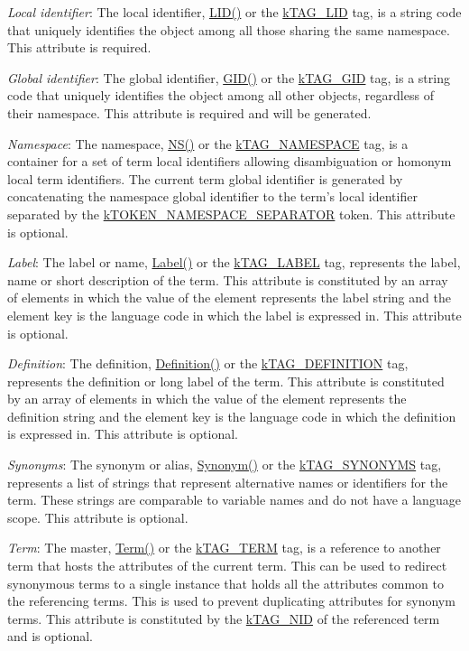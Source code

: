 {\itshape 
\begin{DoxyItemize}
\item {\itshape Local identifier}\-: The local identifier, {\ttfamily \hyperlink{}{L\-I\-D()}} or the {\ttfamily \hyperlink{}{k\-T\-A\-G\-\_\-\-L\-I\-D}} tag, is a string code that uniquely identifies the object among all those sharing the same namespace. This attribute is required. 
\item {\itshape Global identifier}\-: The global identifier, {\ttfamily \hyperlink{}{G\-I\-D()}} or the {\ttfamily \hyperlink{}{k\-T\-A\-G\-\_\-\-G\-I\-D}} tag, is a string code that uniquely identifies the object among all other objects, regardless of their namespace. This attribute is required and will be generated. 
\item {\itshape Namespace}\-: The namespace, {\ttfamily \hyperlink{}{N\-S()}} or the {\ttfamily \hyperlink{}{k\-T\-A\-G\-\_\-\-N\-A\-M\-E\-S\-P\-A\-C\-E}} tag, is a container for a set of term local identifiers allowing disambiguation or homonym local term identifiers. The current term global identifier is generated by concatenating the namespace global identifier to the term's local identifier separated by the \hyperlink{}{k\-T\-O\-K\-E\-N\-\_\-\-N\-A\-M\-E\-S\-P\-A\-C\-E\-\_\-\-S\-E\-P\-A\-R\-A\-T\-O\-R} token. This attribute is optional. 
\item {\itshape Label}\-: The label or name, {\ttfamily \hyperlink{}{Label()}} or the {\ttfamily \hyperlink{}{k\-T\-A\-G\-\_\-\-L\-A\-B\-E\-L}} tag, represents the label, name or short description of the term. This attribute is constituted by an array of elements in which the value of the element represents the label string and the element key is the language code in which the label is expressed in. This attribute is optional. 
\item {\itshape Definition}\-: The definition, {\ttfamily \hyperlink{}{Definition()}} or the {\ttfamily \hyperlink{}{k\-T\-A\-G\-\_\-\-D\-E\-F\-I\-N\-I\-T\-I\-O\-N}} tag, represents the definition or long label of the term. This attribute is constituted by an array of elements in which the value of the element represents the definition string and the element key is the language code in which the definition is expressed in. This attribute is optional. 
\item {\itshape Synonyms}\-: The synonym or alias, {\ttfamily \hyperlink{}{Synonym()}} or the {\ttfamily \hyperlink{}{k\-T\-A\-G\-\_\-\-S\-Y\-N\-O\-N\-Y\-M\-S}} tag, represents a list of strings that represent alternative names or identifiers for the term. These strings are comparable to variable names and do not have a language scope. This attribute is optional. 
\item {\itshape Term}\-: The master, {\ttfamily \hyperlink{}{Term()}} or the {\ttfamily \hyperlink{}{k\-T\-A\-G\-\_\-\-T\-E\-R\-M}} tag, is a reference to another term that hosts the attributes of the current term. This can be used to redirect synonymous terms to a single instance that holds all the attributes common to the referencing terms. This is used to prevent duplicating attributes for synonym terms. This attribute is constituted by the \hyperlink{}{k\-T\-A\-G\-\_\-\-N\-I\-D} of the referenced term and is optional. 
\end{DoxyItemize}}

